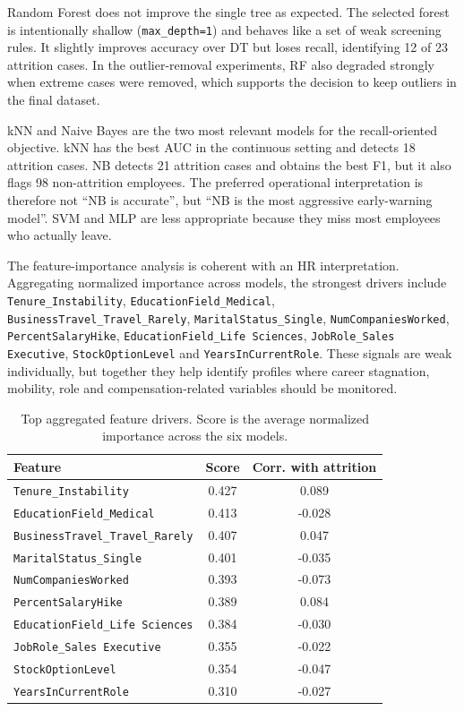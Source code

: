 \documentclass[lettersize,journal]{IEEEtran}
\begin{document}
Random Forest does not improve the single tree as expected. The selected forest is intentionally shallow (\texttt{max\_depth=1}) and behaves like a set of weak screening rules. It slightly improves accuracy over DT but loses recall, identifying 12 of 23 attrition cases. In the outlier-removal experiments, RF also degraded strongly when extreme cases were removed, which supports the decision to keep outliers in the final dataset.

kNN and Naive Bayes are the two most relevant models for the recall-oriented objective. kNN has the best AUC in the continuous setting and detects 18 attrition cases. NB detects 21 attrition cases and obtains the best F1, but it also flags 98 non-attrition employees. The preferred operational interpretation is therefore not ``NB is accurate'', but ``NB is the most aggressive early-warning model''. SVM and MLP are less appropriate because they miss most employees who actually leave.

The feature-importance analysis is coherent with an HR interpretation. Aggregating normalized importance across models, the strongest drivers include \texttt{Tenure\_Instability}, \texttt{EducationField\_Medical}, \texttt{BusinessTravel\_Travel\_Rarely}, \texttt{MaritalStatus\_Single}, \texttt{NumCompaniesWorked}, \texttt{PercentSalaryHike}, \texttt{EducationField\_Life Sciences}, \texttt{JobRole\_Sales Executive}, \texttt{StockOptionLevel} and \texttt{YearsInCurrentRole}. These signals are weak individually, but together they help identify profiles where career stagnation, mobility, role and compensation-related variables should be monitored.

\begin{table}[t]
\caption{Top aggregated feature drivers. Score is the average normalized importance across the six models.}
\label{tab:drivers}
\centering
\scriptsize
\setlength{\tabcolsep}{3pt}
\begin{tabular}{lcc}
\toprule
Feature & Score & Corr. with attrition \\
\midrule
\texttt{Tenure\_Instability} & 0.427 &  0.089 \\
\texttt{EducationField\_Medical} & 0.413 & -0.028 \\
\texttt{BusinessTravel\_Travel\_Rarely} & 0.407 &  0.047 \\
\texttt{MaritalStatus\_Single} & 0.401 & -0.035 \\
\texttt{NumCompaniesWorked} & 0.393 & -0.073 \\
\texttt{PercentSalaryHike} & 0.389 &  0.084 \\
\texttt{EducationField\_Life Sciences} & 0.384 & -0.030 \\
\texttt{JobRole\_Sales Executive} & 0.355 & -0.022 \\
\texttt{StockOptionLevel} & 0.354 & -0.047 \\
\texttt{YearsInCurrentRole} & 0.310 & -0.027 \\
\bottomrule
\end{tabular}
\end{table}
\end{document}
